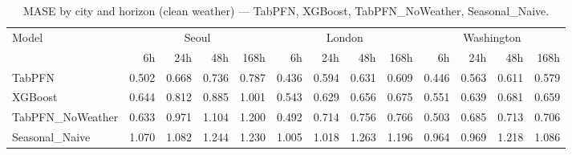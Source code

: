 \begin{table}[ht!]
\centering
\caption{MASE by city and horizon (clean weather) — TabPFN, XGBoost, TabPFN\_NoWeather, Seasonal\_Naive.}
\label{tab:mase_by_city_horizon}
{\small
\setlength{\tabcolsep}{3pt}
\scriptsize
\begin{tabular}{lrrrrrrrrrrrr}
\toprule
Model & \multicolumn{4}{c}{Seoul} & \multicolumn{4}{c}{London} & \multicolumn{4}{c}{Washington} \\
  & 6h & 24h & 48h & 168h & 6h & 24h & 48h & 168h & 6h & 24h & 48h & 168h \\
\midrule
TabPFN & 0.502 & 0.668 & 0.736 & 0.787 & 0.436 & 0.594 & 0.631 & 0.609 & 0.446 & 0.563 & 0.611 & 0.579 \\
XGBoost & 0.644 & 0.812 & 0.885 & 1.001 & 0.543 & 0.629 & 0.656 & 0.675 & 0.551 & 0.639 & 0.681 & 0.659 \\
TabPFN\_NoWeather & 0.633 & 0.971 & 1.104 & 1.200 & 0.492 & 0.714 & 0.756 & 0.766 & 0.503 & 0.685 & 0.713 & 0.706 \\
Seasonal\_Naive & 1.070 & 1.082 & 1.244 & 1.230 & 1.005 & 1.018 & 1.263 & 1.196 & 0.964 & 0.969 & 1.218 & 1.086 \\
\bottomrule
\end{tabular}
}
\end{table}
